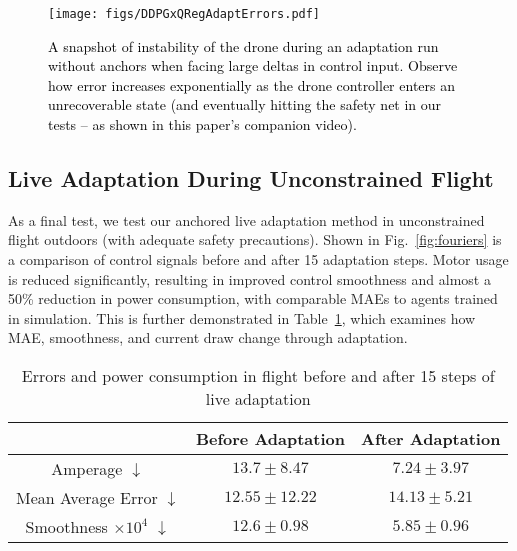 \documentclass[letterpaper, 10 pt, conference]{ieeeconf} %
\newcommand{\rev}[1]{\textcolor{black}{#1}}
\begin{document}
        \begin{figure}[t]
        \centering
        \texttt{[image: figs/DDPGxQRegAdaptErrors.pdf]}
        \caption{
            \rev{
            A snapshot of instability of the drone during an adaptation run without anchors when facing large deltas in control input.
            Observe how error increases exponentially as the drone controller enters an unrecoverable state (and eventually hitting the safety net in our tests -- as shown in this paper's companion video).
            }
        }
        \label{fig:instability}
        \vspace{-1.3\baselineskip}
    \end{figure}
        
    \subsection{Live Adaptation During Unconstrained Flight}\label{subsec:unconstrainedFlight}
    
        As a final test, we test our anchored live adaptation method in unconstrained flight outdoors (with adequate safety precautions).
        Shown in Fig.~\ref{fig:fouriers} is a comparison of control signals before and after 15 adaptation steps.
        Motor usage is reduced significantly, resulting in improved control smoothness and almost a 50\% reduction in power consumption, with comparable MAEs to agents trained in simulation.
        This is further demonstrated in Table~\ref{tab:error_amps}, which examines how MAE, smoothness, and current draw change through adaptation.

        \begin{table}[h]
            \caption{Errors and power consumption in flight before and after 15 steps of live adaptation}
            \vspace{-.5\baselineskip}
            \label{tab:error_amps}
            \centering
            \begin{tabular}{c|c|c}
                \hline & {Before Adaptation} & {After Adaptation} \\
                \hline
                Amperage $\downarrow$ & $13.7 \pm 8.47$ & $7.24 \pm 3.97$\\
                Mean Average Error $\downarrow$ & $12.55 \pm 12.22$ & $14.13 \pm 5.21$\\
                Smoothness $\times 10^{4}$ $\downarrow$ & $12.6 \pm 0.98$ & $5.85 \pm 0.96$ \\
                \hline
            \end{tabular}
            \vspace{-1.5\baselineskip}
        \end{table}
        
\end{document}
